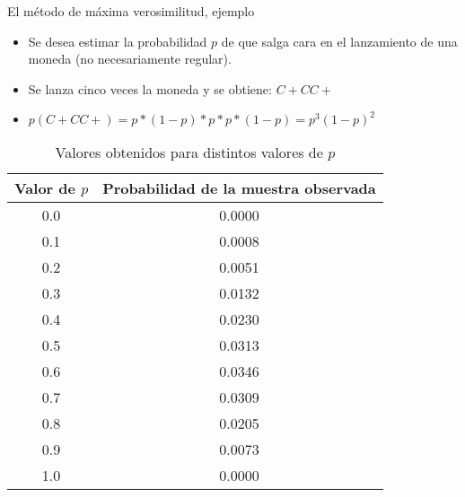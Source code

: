 \documentclass[xcolor=x11names,compress]{beamer}
\renewcommand{\(}{\begin{columns}}
\renewcommand{\)}{\end{columns}}
\newcommand{\<}[1]{\begin{column}{#1}}
\renewcommand{\>}{\end{column}}
\begin{document}
\begin{frame}{El método de máxima verosimilitud, ejemplo}
\begin{itemize}
	\item Se desea estimar la probabilidad $p$ de que salga cara en el lanzamiento de una moneda (no necesariamente regular).
	\item Se lanza cinco veces la moneda y se obtiene: $C+CC+$
	\item $p(C+CC+) = p * (1 - p) * p * p * (1 - p) = p^3 (1 - p)^2$
\end{itemize}
\begin{table}[h]
\tiny
\centering
\begin{tabular}{@{}cc@{}}
\toprule
\textbf{Valor de $p$} & \textbf{Probabilidad de la muestra observada} \\ \midrule
0.0                 & 0.0000                                        \\
0.1                 & 0.0008                                        \\
0.2                 & 0.0051                                        \\
0.3                 & 0.0132                                        \\
0.4                 & 0.0230                                        \\
0.5                 & 0.0313                                        \\
0.6                 & 0.0346                                        \\
0.7                 & 0.0309                                        \\
0.8                 & 0.0205                                         \\
0.9                 & 0.0073                                        \\
1.0                 & 0.0000                                        \\ \bottomrule
\end{tabular}
\caption{Valores obtenidos para distintos valores de $p$}
\end{table}
\end{frame}
\end{document}
